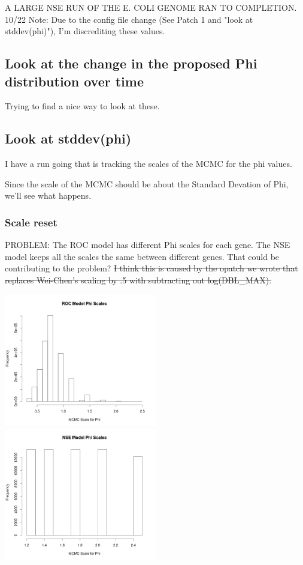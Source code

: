 A LARGE NSE RUN OF THE E. COLI GENOME RAN TO COMPLETION.
10/22 Note: Due to the config file change (See Patch 1 and "look at stddev(phi)"), I'm discrediting these values.








\subsection{Look at the change in the proposed Phi distribution over time}

Trying to find a nice way to look at these.

%

\newpage
\subsection{Look at stddev(phi)}

I have a run going that is tracking the scales of the MCMC for the phi values.

Since the scale of the MCMC should be about the Standard Devation of Phi, we'll see what happens.

\subsubsection{Scale reset}
PROBLEM:
The ROC model has different Phi scales for each gene. The NSE model keeps all the scales the same between different genes. That could be contributing to the problem? \sout{I think this is caused by the opatch we wrote that replaces Wei-Chen's scaling by .5  with subtracting out log(DBL\_MAX).}

\includegraphics[width=0.5\textwidth]{data/oct10-roc-scalehist.png}
\includegraphics[width=0.5\textwidth]{data/oct10-nse-scalehist.png}

